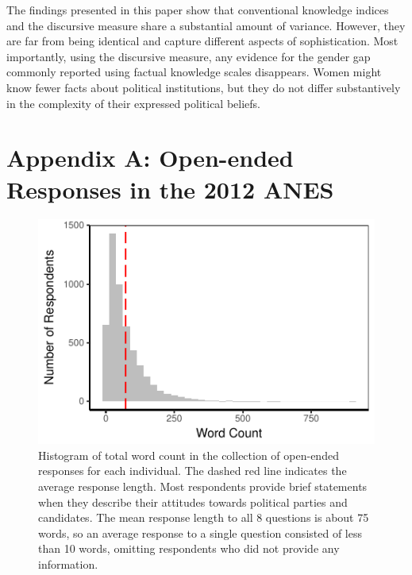 \documentclass[12pt]{article}
\begin{document}
The findings presented in this paper show that conventional knowledge indices and the discursive measure share a substantial amount of variance. However, they are far from being identical and capture different aspects of sophistication. Most importantly, using the discursive measure, any evidence for the gender gap commonly reported using factual knowledge scales disappears. Women might know fewer facts about political institutions, but they do not differ substantively in the complexity of their expressed political beliefs.

\singlespacing



\clearpage
\section*{Appendix A: Open-ended Responses in the 2012 ANES}
\renewcommand\thefigure{A.\arabic{figure}}
\renewcommand\thetable{A.\arabic{table}}
\setcounter{figure}{0}
\setcounter{table}{0}

\begin{figure}[h]\centering
\includegraphics{../fig/wc.pdf}
\caption{Histogram of total word count in the collection of open-ended responses for each individual. The dashed red line indicates the average response length. Most respondents provide brief statements when they describe their attitudes towards political parties and candidates. The mean response length to all 8 questions is about 75 words, so an average response to a single question consisted of less than 10 words, omitting respondents who did not provide any information.}\label{fig:wc}
\end{figure}
\end{document}

